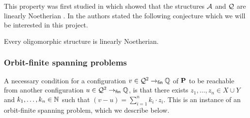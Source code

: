 \documentclass[a4paper,11pt]{article}
\begin{document}
This property was first studied in \cite{BKM21} which showed that the structures $\mathcal{A}$ and $\mathcal{Q}$ are linearly Noetherian \cite[Lemma IV.8]{BKM21}.
In \cite[Page 21]{BKM21} the authors stated the following conjecture which we will be interested in this project.
%
\begin{conjecture}\label{conj:lin noeth}
Every oligomorphic structure is linearly Noetherian.
\end{conjecture}
%
%
%
\subsubsection{Orbit-finite spanning problems}\label{subsec:span}
%
A necessary condition for a configuration $v\in\mathcal{Q}^2 \to_{\mathsf{fin}} \mathbb{Q}$ of $\mathbf{P}$ to be reachable from another configuration $u\in\mathcal{Q}^2 \to_{\mathsf{fin}} \mathbb{Q}$,
%
%
%
is that there exists $z_1,\dots,z_n\in X\cup Y$ and $k_1,\dots,k_n\in\mathbb{N}$ such that
$(v - u) = \sum_{i=1}^n k_i\cdot z_i$.
This is an instance of an orbit-finite spanning problem, which we describe below.
\end{document}
